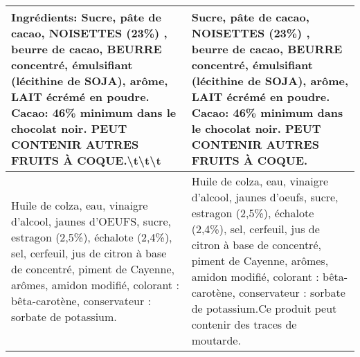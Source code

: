 \begin{longtable}{p{7cm}p{7cm}}
                                                                                                                                                                                                                                                                                                                                                                                                                                                                                                                                                                   Ingrédients: Sucre, pâte de cacao, NOISETTES (23\%) , beurre de cacao, BEURRE concentré, émulsifiant (lécithine de SOJA), arôme, LAIT écrémé en poudre. Cacao: 46\% minimum dans le chocolat noir. PEUT CONTENIR AUTRES FRUITS À COQUE.\textbackslash t\textbackslash t\textbackslash t\newline  &                                                                                                                                                                                                                                                                                                                                                                                                                                                                                                                                                                                   Sucre, pâte de cacao, NOISETTES (23\%) , beurre de cacao, BEURRE concentré, émulsifiant (lécithine de SOJA), arôme, LAIT écrémé en poudre. Cacao: 46\% minimum dans le chocolat noir. PEUT CONTENIR AUTRES FRUITS À COQUE. \\ \hline
                                                                                                                                                                                                                                                                                                                                                                                                                                                                                                                                                    Huile de colza, eau, vinaigre d'alcool, jaunes d'OEUFS, sucre, estragon (2,5\%), échalote (2,4\%), sel, cerfeuil, jus de citron à base de concentré, piment de Cayenne, arômes, amidon modifié, colorant : bêta-carotène, conservateur : sorbate de potassium. &                                                                                                                                                                                                                                                                                                                                                                                                                                                                                               Huile de colza, eau, vinaigre d'alcool, jaunes d'oeufs, sucre, estragon (2,5\%), échalote (2,4\%), sel, cerfeuil, jus de citron à base de concentré, piment de Cayenne, arômes, amidon modifié, colorant : bêta-carotène, conservateur : sorbate de potassium.Ce produit peut contenir des traces de moutarde. \\
\bottomrule
\end{longtable}
